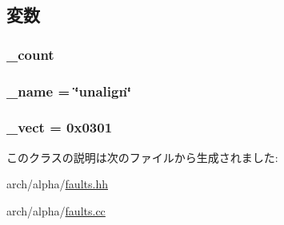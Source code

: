 \subsection{変数}
\hypertarget{classAlphaISA_1_1AlignmentFault_a4bff925c412f331c5aaf6a39b79619ff}{
\subsubsection[{\_\-count}]{ {\bf \_\-count}}}
\label{classAlphaISA_1_1AlignmentFault_a4bff925c412f331c5aaf6a39b79619ff}
\hypertarget{classAlphaISA_1_1AlignmentFault_ac79073ffcd2c66a09bcd3bd3ad206019}{
\subsubsection[{\_\-name}]{ {\bf \_\-name} = \char`\"{}unalign\char`\"{}}}
\label{classAlphaISA_1_1AlignmentFault_ac79073ffcd2c66a09bcd3bd3ad206019}
\hypertarget{classAlphaISA_1_1AlignmentFault_ad9e5855b9db0b2824cf6c507be4a872e}{
\subsubsection[{\_\-vect}]{ {\bf \_\-vect} = 0x0301}}
\label{classAlphaISA_1_1AlignmentFault_ad9e5855b9db0b2824cf6c507be4a872e}


このクラスの説明は次のファイルから生成されました:\begin{DoxyCompactItemize}
\item 
arch/alpha/\hyperlink{arch_2alpha_2faults_8hh}{faults.hh}\item 
arch/alpha/\hyperlink{arch_2alpha_2faults_8cc}{faults.cc}\end{DoxyCompactItemize}
